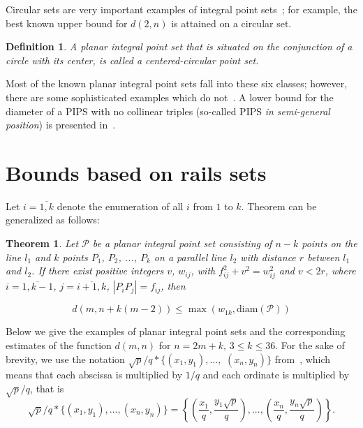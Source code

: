 \documentclass[12pt]{article}
\theoremstyle{theorem}
\newtheorem{theorem}{Theorem}
\theoremstyle{dfn}
\newtheorem{dfn}{Definition}
\theoremstyle{remark}
\begin{document}
Circular sets are very important examples
of integral point sets~\cite{harborth1993upper,piepmeyer1996maximum,bat2018number};
for example, the best known upper bound for $d(2,n)$
is attained on a circular set.


\begin{dfn}
	A planar integral point set that is situated on the conjunction of a circle with its center,
	is called a \textit{centered-circular} point set.
\end{dfn}

Most of the known planar integral point sets fall into these six classes;
however, there are some sophisticated examples which do not~\cite{kreisel2008heptagon,kurz2013constructing,avdeev2021particular}.
A lower bound for the diameter of a PIPS with no collinear triples (so-called PIPS \textit{in semi-general position})
is presented in~\cite{my-semi-general-5-4-bound-2019}.



\section{Bounds based on rails sets}

Let $i = \overline{1, k}$ denote the enumeration of all $i$
from $1$ to $k$.
Theorem \cite[Theorem 2.1]{kurz2008bounds} can be generalized as follows:

\begin{theorem}
	\label{thm:rails_blowup}
	Let $\mathcal{P}$ be a planar integral point set consisting of
	$n - k$ points on the line $l_1$ and $k$ points $P_1$, $P_2$, ..., $P_k$ on a
	parallel line $l_2$ with distance $r$ between $l_1$ and $l_2$. If there
	exist positive integers $v$, $w_{ij}$, with $f_{ij}^{2} + v^{2}
	= w_{ij}^{2}$ and $v < 2r$, where $i = \overline{1, k - 1}$, $j =
	\overline{i + 1, k}$, $|P_{i}P_{j}| = f_{ij}$,
	then

	\begin{equation}
		d(m, n + k(m - 2)) \leq \max(w_{1k}, \operatorname{diam(\mathcal{P})})
	\end{equation}

\end{theorem}

Below we give the examples of planar integral point sets and the corresponding
estimates of the function $d(m, n)$ for $n = 2m + k$, $3 \leq k \leq 36$.
For the sake of brevity, we use the notation
$\sqrt{p}/q * \{ (x_1,y_1), ...,$ $ (x_n, y_n)  \}$
from~\cite{our-ped-2018,our-pmm-2018,our-vmmsh-2018},
which means that each abscissa is multiplied by $1/q$
and each ordinate is multiplied by $\sqrt{p}/q$,  that is
$$
	\sqrt{p}/q * \{ (x_1,y_1), ..., (x_n, y_n)  \}
	=
	\left\{ \left(\frac{x_1}{q},\frac{y_1\sqrt{p}}{q}\right), ..., \left(\frac{x_n}{q},   \frac{y_n\sqrt{p}}{q}\right)  \right\}.
$$
\end{document}
